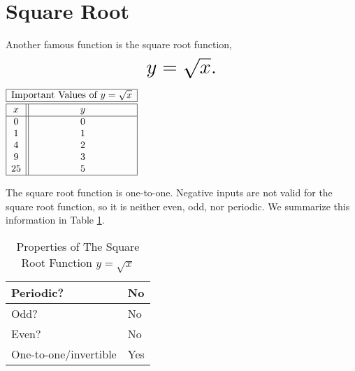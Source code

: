 \documentclass[nooutcomes]{ximera}
\begin{document}
\newpage


\section{Square Root}
Another famous function is the square root function, $$ \mbox{\huge $y=\sqrt{x}.$}$$ 

\begin{image}
\end{image}


\begin{center}
\(
\begin{array}{ |c || c|  }
 \hline
 \multicolumn{2}{|c|}{\text{\normalfont Important Values of } y=\sqrt{x}} \\
\hline
 \hline
 x & y\\
 \hline
 0&0\\
 1&1\\
 4&2\\
 9&3\\
 25&5\\
 \hline
\end{array}
\)
\end{center}

The square root function is one-to-one. Negative inputs are not valid for the square root function, so it is neither even, odd, nor periodic. We summarize this information in Table \ref{tab:sqrtproperties}.

\begin{table}[h]
\caption{\label{tab:sqrtproperties}Properties of The Square Root Function $y = \sqrt{x}$}
\centering
\begin{tabular}{l|l}
Periodic? & No\\ \hline
Odd? &  No \\ \hline
Even? & No \\ \hline
One-to-one/invertible & Yes
\end{tabular}
\end{table}

\newpage

\end{document}
